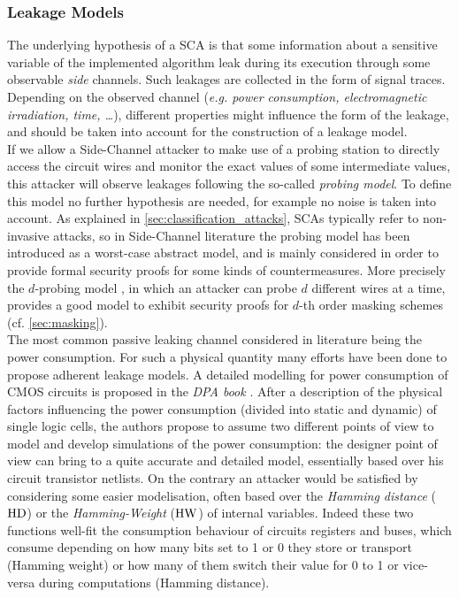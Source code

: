 \subsubsection{Leakage Models}\label{sec:leakage_model}
The underlying hypothesis of a SCA is that some information about  a sensitive variable of the implemented algorithm leak during its execution through some observable \emph{side} channels. Such leakages are collected 
in the form of signal traces. Depending on the observed channel (\emph{e.g. power consumption, electromagnetic irradiation, time, \dots}), different properties might influence the form of the leakage, and should be taken into account for the construction of a leakage model.\\
If we allow a Side-Channel attacker to make use of a probing station to directly access the circuit wires and monitor the exact values of some intermediate values, this attacker will observe leakages following the so-called \emph{probing model}. To define this model no further hypothesis are needed, for example no noise is taken into account. As explained in \ref{sec:classification_attacks}, SCAs typically refer to non-invasive attacks, so in Side-Channel literature the probing model has been introduced as a worst-case abstract model, and is mainly considered in order to provide formal security proofs for some kinds of countermeasures. More precisely the $d$-probing model \cite{ishai2003private}, in which an attacker can probe $d$ different wires at a time, provides a good model to exhibit security proofs for $d$-th order masking schemes (cf. \ref{sec:masking}). \\
The most common passive leaking channel considered in literature being the power consumption. For such a physical quantity many efforts have been done to propose adherent leakage models. A detailed modelling for power consumption of CMOS circuits is proposed in the \emph{DPA book} \cite{mangard2008power}. After a description of the physical factors influencing the power consumption (divided into static and dynamic) of single logic cells, the authors propose to assume two different points of view to model and develop simulations of the power consumption: the designer point of view can bring to a quite accurate and detailed model, essentially based over his circuit transistor netlists. On the contrary an attacker would be satisfied by considering some easier modelisation, often based over the \emph{Hamming distance} ($\mathrm{HD}$) or the \emph{Hamming-Weight} ($\mathrm{HW}$) of internal variables. Indeed these two functions well-fit the consumption behaviour of circuits registers and buses, which consume depending on how many bits set to 1 or 0 they store or transport (Hamming weight) or how many of them switch their value for 0 to 1 or vice-versa during computations (Hamming distance). \\
